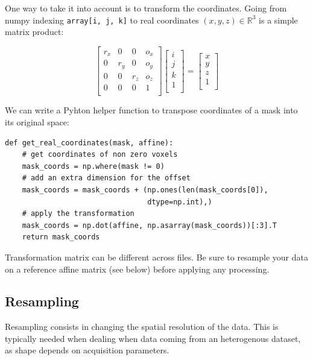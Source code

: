 \documentclass{frontiersSCNS} %
\begin{document}
One way to take it into account is to transform the coordinates. Going from
numpy indexing \verb!array[i, j, k]! to real coordinates $(x, y, z) \in
\mathbb{R}^3$ is a simple matrix product:

\[
    \begin{bmatrix}
        r_x & 0   & 0   & o_x \\
        0   & r_y & 0   & o_y \\
        0   & 0   & r_z & o_z \\
        0   & 0   & 0   & 1   \\
    \end{bmatrix}
    \begin{bmatrix}
        i \\
        j \\
        k \\
        1 \\
    \end{bmatrix}
    =
    \begin{bmatrix}
        x \\
        y \\
        z \\
        1 \\
    \end{bmatrix}
\]

We can write a Pyhton helper function to transpose coordinates of a mask into
its original space:


\begin{lstlisting}
def get_real_coordinates(mask, affine):
    # get coordinates of non zero voxels
    mask_coords = np.where(mask != 0)
    # add an extra dimension for the offset
    mask_coords = mask_coords + (np.ones(len(mask_coords[0]),
                                 dtype=np.int),)
    # apply the transformation
    mask_coords = np.dot(affine, np.asarray(mask_coords))[:3].T
    return mask_coords
\end{lstlisting}

Transformation matrix can be different across files. Be sure to resample your
data on a reference affine matrix (see below) before applying any processing.

\subsection{Resampling}
\label{resampling}

Resampling consists in changing the spatial resolution of the data. This is
typically needed
when dealing when data coming from an heterogenous dataset, as shape depends
on acquisition parameters.
\end{document}
